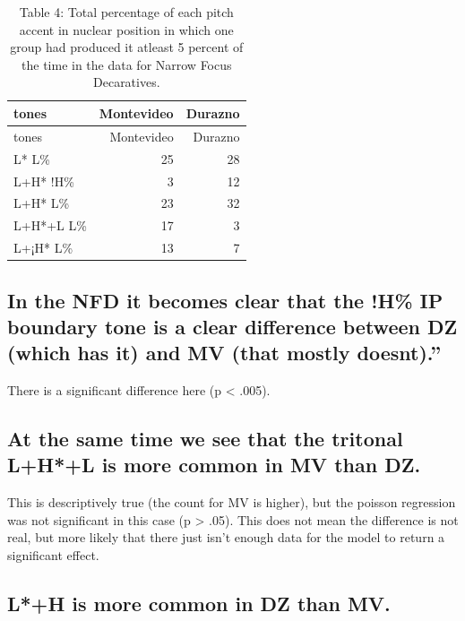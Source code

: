 \documentclass[
  man]{apa6}
\begin{document}
\begin{longtable}[]{@{}lrr@{}}
\caption{\label{tab:unnamed-chunk-8}Table 4: Total percentage of each pitch accent in nuclear position in which one group had produced it atleast 5 percent of the time in the data for Narrow Focus Decaratives.}\tabularnewline
\toprule\noalign{}
tones & Montevideo & Durazno \\
\midrule\noalign{}
\endfirsthead
\toprule\noalign{}
tones & Montevideo & Durazno \\
\midrule\noalign{}
\endhead
\bottomrule\noalign{}
\endlastfoot
L* L\% & 25 & 28 \\
L+H* !H\% & 3 & 12 \\
L+H* L\% & 23 & 32 \\
L+H*+L L\% & 17 & 3 \\
L+¡H* L\% & 13 & 7 \\
\end{longtable}

\hypertarget{in-the-nfd-it-becomes-clear-that-the-h-ip-boundary-tone-is-a-clear-difference-between-dz-which-has-it-and-mv-that-mostly-doesnt.}{%
\subsection{In the NFD it becomes clear that the !H\% IP boundary tone is a clear difference between DZ (which has it) and MV (that mostly doesnt).''}\label{in-the-nfd-it-becomes-clear-that-the-h-ip-boundary-tone-is-a-clear-difference-between-dz-which-has-it-and-mv-that-mostly-doesnt.}}

There is a significant difference here (p \textless{} .005).

\hypertarget{at-the-same-time-we-see-that-the-tritonal-lhl-is-more-common-in-mv-than-dz.}{%
\subsection{At the same time we see that the tritonal L+H*+L is more common in MV than DZ.}\label{at-the-same-time-we-see-that-the-tritonal-lhl-is-more-common-in-mv-than-dz.}}

This is descriptively true (the count for MV is higher), but the poisson regression was not significant in this case (p \textgreater{} .05). This does not mean the difference is not real, but more likely that there just isn't enough data for the model to return a significant effect.

\hypertarget{lh-is-more-common-in-dz-than-mv.}{%
\subsection{L*+H is more common in DZ than MV.}\label{lh-is-more-common-in-dz-than-mv.}}
\end{document}
